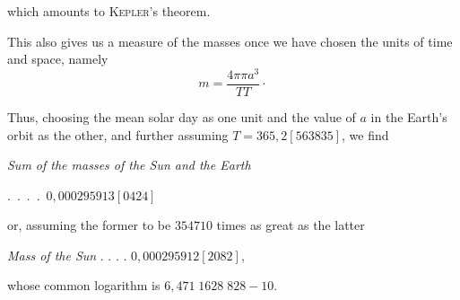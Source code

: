 which amounts to \textsc{Kepler}’s theorem.
\par This also gives us a measure of the masses once we have chosen the units of time and space, namely
\[
m=\frac{4\pi\pi a^3}{TT}\mathpunct{\cdot}
\]
\par Thus, choosing the mean solar day as one unit and the value of \(a\) in the Earth’s orbit as the other, and further assuming \(T=365{,}2[563835]\), we find
\begin{center}
\textit{Sum of the masses of the Sun and the Earth}\par\nobreak
\mbox{. . . . \(0{,}000295913[0424]\)}
\end{center}
or, assuming the former to be \(354710\) times as great as the latter
\begin{center}
\textit{Mass of the Sun} . . . . \(0{,}000295912[2082]\),
\end{center}
whose common logarithm is \(6{,}471\;1628\;828-10\).
